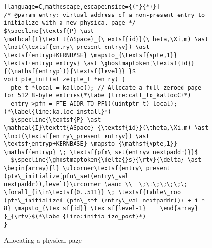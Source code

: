 \begin{figure}\footnotesize
  \begin{lstlisting}[language=C,mathescape,escapeinside={(*}{*)}]
/* @param entry: virtual address of a non-present entry to initialize with a new physical page */
$\specline{\textsf{P} \ast \mathcal{I}\texttt{ASpace}_{\textsf{id}}(\theta,\Xi,m) \ast \lnot(\textsf{entry\_present entryv}) \ast \textsf{entryp+KERNBASE} \mapsto_{\textsf{vpte,1}} \textsf{entryp entryv} \ast \ghostmaptoken{\textsf{id}}{(\mathsf{entryp})}{\textsf{level}} }$
void pte_initialize(pte_t *entry) {
  pte_t *local = kalloc(); // Allocate a full zeroed page for 512 8-byte entries(*\label{line:call_to_kallocC}*)
  entry->pfn = PTE_ADDR_TO_PFN((uintptr_t) local);(*\label{line:kalloc_install}*)
  $\specline{\textsf{P} \ast \mathcal{I}\texttt{ASpace}_{\textsf{id}}(\theta,\Xi,m) \ast \lnot(\textsf{entry\_present entryv}) \ast \textsf{entryp+KERNBASE} \mapsto_{\mathsf{vpte,1}} \mathsf{entryp} \; \textsf{pfn\_set(entryv nextpaddr)}}$
  $\specline{\ghostmaptoken{\delta{}s}{\rtv}{\delta} \ast \begin{array}{l} \ulcorner\textsf{entry\_present (pte\_initialize(pfn\_set(entry\_val nextpaddr)),level)}\urcorner \wand \\  \;\;\;\;\;\;\; \forall_{i\in\textsf{0..511}} \; \textsf{table\_root (pte\_initialized (pfn\_set (entry\_val nextpaddr))) + i * 8} \mapsto_{\textsf{id}} \textsf{level-1}    \end{array}  }_{\rtv}$(*\label{line:initialize_post}*)
}
\end{lstlisting}
\vspace{-2em}
\caption{Allocating a physical page }
\label{pteinitializespecC}
\vspace{-1em}
\end{figure}

